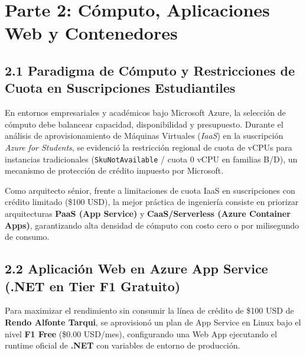 \section{Parte 2: Cómputo, Aplicaciones Web y Contenedores}

\subsection{2.1 Paradigma de Cómputo y Restricciones de Cuota en Suscripciones Estudiantiles}
En entornos empresariales y académicos bajo Microsoft Azure, la selección de cómputo debe balancear capacidad, disponibilidad y presupuesto. Durante el análisis de aprovisionamiento de Máquinas Virtuales (\textit{IaaS}) en la suscripción \textit{Azure for Students}, se evidenció la restricción regional de cuota de vCPUs para instancias tradicionales (\texttt{SkuNotAvailable} / cuota 0 vCPU en familias B/D), un mecanismo de protección de crédito impuesto por Microsoft.

\begin{archnote}
Como arquitecto sénior, frente a limitaciones de cuota IaaS en suscripciones con crédito limitado (\$100 USD), la mejor práctica de ingeniería consiste en priorizar arquitecturas \textbf{PaaS (App Service)} y \textbf{CaaS/Serverless (Azure Container Apps)}, garantizando alta densidad de cómputo con costo cero o por milisegundo de consumo.
\end{archnote}


\subsection{2.2 Aplicación Web en Azure App Service (.NET en Tier F1 Gratuito)}
Para maximizar el rendimiento sin consumir la línea de crédito de \$100 USD de \textbf{Rendo Alfonte Tarqui}, se aprovisionó un plan de App Service en Linux bajo el nivel \textbf{F1 Free} (\$0.00 USD/mes), configurando una Web App ejecutando el runtime oficial de \textbf{.NET} con variables de entorno de producción.

